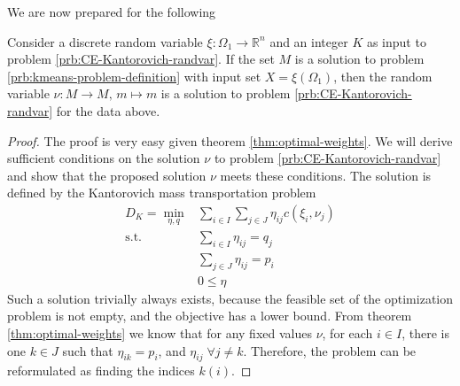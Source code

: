 We are now prepared for the following
\begin{thm}
Consider a discrete random variable $\xi : \Omega_1\rightarrow \mathbb{R}^n$ and an integer $K$ as input to problem \ref{prb:CE-Kantorovich-randvar}.
If the set $M$ is a solution to problem \ref{prb:kmeans-problem-definition} with input set $X=\xi(\Omega_1)$, then the random variable $\nu : M \rightarrow M,\, m\mapsto m$ is a solution to problem \ref{prb:CE-Kantorovich-randvar} for the data above.
\end{thm}
\begin{proof}
  The proof is very easy given theorem \ref{thm:optimal-weights}. 
  We will derive sufficient conditions on the solution $\nu$ to problem \ref{prb:CE-Kantorovich-randvar} and show that the proposed solution $\nu$ meets these conditions.
  The solution is defined by the Kantorovich mass transportation problem
  \begin{align}
    \label{eq:kantoro-in-problemequivalence-proof}
    D_K = \min\limits_{\eta, q}& \sum_{i\in I}\sum_{j\in J}\eta_{ij}c(\xi_i,\nu_j)\\
    \text{s.t.}&\sum_{i\in I}\eta_{ij} = q_j\\
    &\sum_{j\in J}\eta_{ij} = p_i\\
    &0\leq \eta
  \end{align}
  Such a solution trivially always exists, because the feasible set of the optimization problem is not empty, and the objective has a lower bound.
  From theorem \ref{thm:optimal-weights} we know that for any fixed values $\nu$, for each $i\in I$, there is one $k\in J$ such that $\eta_{ik} = p_i$, and $\eta_{ij}\;\forall j\neq k$. Therefore, the problem can be reformulated as finding the indices $k(i)$.  
\end{proof}
